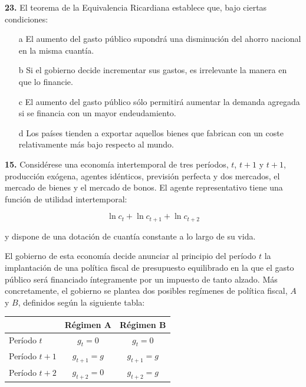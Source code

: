\documentclass{nuevotema}
\begin{document}

\textbf{23.} El teorema de la Equivalencia Ricardiana establece que, bajo ciertas condiciones:

\begin{itemize}
	\item[a] El aumento del gasto público supondrá una disminución del ahorro nacional en la misma cuantía.
	\item[b] Si el gobierno decide incrementar sus gastos, es irrelevante la manera en que lo financie.
	\item[c] El aumento del gasto público sólo permitirá aumentar la demanda agregada si se financia con un mayor endeudamiento.
	\item[d] Los países tienden a exportar aquellos bienes que fabrican con un coste relativamente más bajo respecto al mundo.
\end{itemize}

\textbf{15.} Considérese una economía intertemporal de tres períodos, $t$, $t+1$ y $t+1$, producción exógena, agentes idénticos, previsión perfecta y dos mercados, el mercado de bienes y el mercado de bonos. El agente representativo tiene una función de utilidad intertemporal:

\begin{equation*}
\ln c_t + \ln c_{t+1} + \ln c_{t+2}
\end{equation*}

y dispone de una dotación de cuantía constante a lo largo de su vida.

El gobierno de esta economía decide anunciar al principio del período $t$ la implantación de una política fiscal de presupuesto equilibrado en la que el gasto público será financiado íntegramente por un impuesto de tanto alzado. Más concretamente, el gobierno se plantea dos posibles regímenes de política fiscal, $A$ y $B$, definidos según la siguiente tabla:

\begin{center}
\begin{tabular}{l c c}
& Régimen A & Régimen B \\ \hline 
Período $t$ & $g_t = 0$ & $g_t = 0$ \\ \hline 
Período $t+1$ & $g_{t+1} = g$ & $g_{t+1} = g$ \\ \hline 
Período $t+2$ & $g_{t+2} = 0$ & $g_{t+2} = g$ \\ \hline
\end{tabular}
\end{center}
\end{document}
